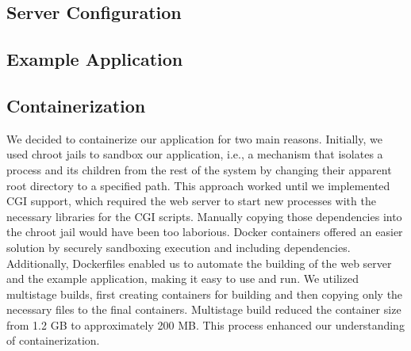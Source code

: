 \subsection*{Server Configuration}


\subsection*{Example Application}


\subsection*{Containerization}

We decided to containerize our application for two main reasons. Initially, we used chroot jails to sandbox our application, i.e., a mechanism that isolates a process and its children from the rest of the system by changing their apparent root directory to a specified path. This approach worked until we implemented CGI support, which required the web server to start new processes with the necessary libraries for the CGI scripts. Manually copying those dependencies into the chroot jail would have been too laborious. Docker containers offered an easier solution by securely sandboxing execution and including dependencies. Additionally, Dockerfiles enabled us to automate the building of the web server and the example application, making it easy to use and run. We utilized multistage builds, first creating containers for building and then copying only the necessary files to the final containers. Multistage build reduced the container size from 1.2 GB to approximately 200 MB. This process enhanced our understanding of containerization.

